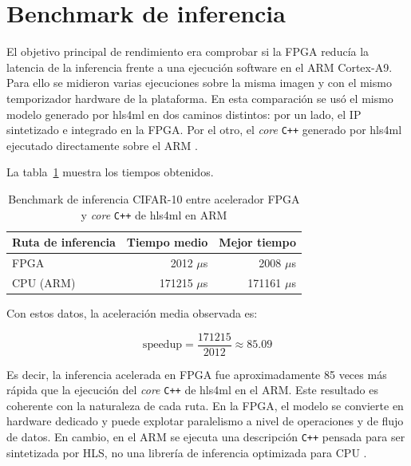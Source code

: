 \section{Benchmark de inferencia}

El objetivo principal de rendimiento era comprobar si la \ac{FPGA} reducía la latencia de
la inferencia
frente a una ejecución software en el \ac{ARM} Cortex-A9. Para ello se midieron varias
ejecuciones sobre
la misma imagen y con el mismo temporizador hardware de la plataforma. En esta comparación se usó
el mismo modelo generado por hls4ml en dos caminos distintos: por un lado, el \ac{IP} sintetizado e
integrado en la \ac{FPGA}. Por el otro, el \textit{core} \texttt{C++} generado por hls4ml
ejecutado directamente sobre el
\ac{ARM} \citep{hls4mlDocs}.

La tabla~\ref{tab:benchmarkCifar10FpgaArm} muestra los tiempos obtenidos.

\begin{table}[h!]
\centering
\begin{tabular}{|l|r|r|}
\hline
\textbf{Ruta de inferencia} & \textbf{Tiempo medio} & \textbf{Mejor tiempo} \\ \hline
\ac{FPGA} & 2012 $\mu$s & 2008 $\mu$s \\ \hline
\ac{CPU} (\ac{ARM}) & 171215 $\mu$s & 171161 $\mu$s \\ \hline
\end{tabular}
\caption{Benchmark de inferencia CIFAR-10 entre acelerador FPGA y \textit{core}
\texttt{C++} de hls4ml en ARM}
\label{tab:benchmarkCifar10FpgaArm}
\end{table}

Con estos datos, la aceleración media observada es:

\begin{equation}
\mathrm{speedup} = \frac{171215}{2012} \approx 85.09
\end{equation}

Es decir, la inferencia acelerada en \ac{FPGA} fue aproximadamente 85 veces más rápida
que la ejecución
del \textit{core} \texttt{C++} de hls4ml en el \ac{ARM}. Este resultado es coherente con
la naturaleza de cada ruta. En la
\ac{FPGA}, el modelo se convierte en hardware dedicado y puede explotar paralelismo a nivel de
operaciones y de flujo de datos. En cambio, en el \ac{ARM} se ejecuta una descripción
\texttt{C++} pensada para
ser sintetizada por \ac{HLS}, no una librería de inferencia optimizada para \ac{CPU}
\citep{sze2017efficientprocessingdeepneural}.

